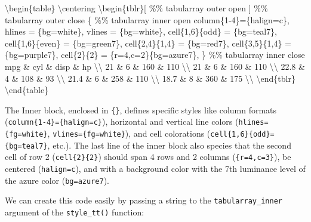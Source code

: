 \documentclass[
  letterpaper,
  DIV=11,
  numbers=noendperiod]{scrartcl}
\newenvironment{Shaded}{\begin{snugshade}}{\end{snugshade}}
\newcommand{\CommentTok}[1]{\textcolor[rgb]{0.37,0.37,0.37}{#1}}
\newcommand{\ExtensionTok}[1]{\textcolor[rgb]{0.00,0.23,0.31}{#1}}
\newcommand{\FunctionTok}[1]{\textcolor[rgb]{0.28,0.35,0.67}{#1}}
\newcommand{\KeywordTok}[1]{\textcolor[rgb]{0.00,0.23,0.31}{#1}}
\newcommand{\NormalTok}[1]{\textcolor[rgb]{0.00,0.23,0.31}{#1}}
\begin{document}
\begin{Shaded}
\begin{Highlighting}[]
\KeywordTok{\textbackslash{}begin}\NormalTok{\{}\ExtensionTok{table}\NormalTok{\}}
\FunctionTok{\textbackslash{}centering}
\KeywordTok{\textbackslash{}begin}\NormalTok{\{}\ExtensionTok{tblr}\NormalTok{\}[         }\CommentTok{\%\% tabularray outer open}
\NormalTok{]                     }\CommentTok{\%\% tabularray outer close}
\NormalTok{\{                     }\CommentTok{\%\% tabularray inner open}
\NormalTok{column\{1{-}4\}=\{halign=c\},}
\NormalTok{hlines = \{bg=white\},}
\NormalTok{vlines = \{bg=white\},}
\NormalTok{cell\{1,6\}\{odd\} = \{bg=teal7\},}
\NormalTok{cell\{1,6\}\{even\} = \{bg=green7\},}
\NormalTok{cell\{2,4\}\{1,4\} = \{bg=red7\},}
\NormalTok{cell\{3,5\}\{1,4\} = \{bg=purple7\},}
\NormalTok{cell\{2\}\{2\} = \{r=4,c=2\}\{bg=azure7\},}
\NormalTok{\}                     }\CommentTok{\%\% tabularray inner close}
\NormalTok{mpg \& cyl \& disp \& hp }\FunctionTok{\textbackslash{}\textbackslash{}}
\NormalTok{21 \& 6 \& 160 \& 110 }\FunctionTok{\textbackslash{}\textbackslash{}}
\NormalTok{21 \& 6 \& 160 \& 110 }\FunctionTok{\textbackslash{}\textbackslash{}}
\NormalTok{22.8 \& 4 \& 108 \& 93 }\FunctionTok{\textbackslash{}\textbackslash{}}
\NormalTok{21.4 \& 6 \& 258 \& 110 }\FunctionTok{\textbackslash{}\textbackslash{}}
\NormalTok{18.7 \& 8 \& 360 \& 175 }\FunctionTok{\textbackslash{}\textbackslash{}}
\KeywordTok{\textbackslash{}end}\NormalTok{\{}\ExtensionTok{tblr}\NormalTok{\}}
\KeywordTok{\textbackslash{}end}\NormalTok{\{}\ExtensionTok{table}\NormalTok{\}}
\end{Highlighting}
\end{Shaded}

The Inner block, enclosed in \texttt{\{\}}, defines specific styles like
column formats (\texttt{column\{1-4\}=\{halign=c\}}), horizontal and
vertical line colors (\texttt{hlines=\{fg=white\}},
\texttt{vlines=\{fg=white\}}), and cell colorations
(\texttt{cell\{1,6\}\{odd\}=\{bg=teal7\}}, etc.). The last line of the
inner block also species that the second cell of row 2
(\texttt{cell\{2\}\{2\}}) should span 4 rows and 2 columns
(\texttt{\{r=4,c=3\}}), be centered (\texttt{halign=c}), and with a
background color with the 7th luminance level of the azure color
(\texttt{bg=azure7}).

We can create this code easily by passing a string to the
\texttt{tabularray\_inner} argument of the \texttt{style\_tt()}
function:
\end{document}
